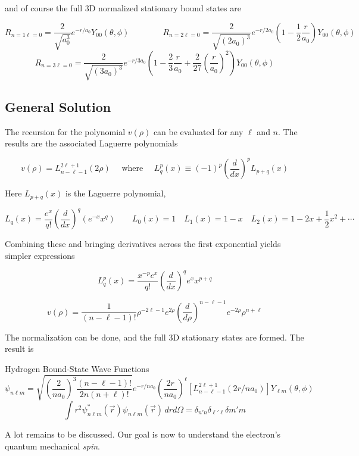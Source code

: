 and of course the full 3D normalized stationary bound states are 

\[ R_{n=1\ell =0} = \frac{2}{\sqrt{a_0^3}}e^{-r / a_0} Y_{00} (\theta, \phi) \qquad \qquad R_{n=2
  \ell =0} = \frac{2}{\sqrt{(2a_0)^3}}e^{-r / 2a_0} \left( 1 - \frac{1}{2}
\frac{r}{a_0} \right)Y_{00} (\theta, \phi) \] 
\[ R_{n=3 \ell = 0} = \frac{2}{\sqrt{(3a_0)^3}}e^{-r / 3a_0} \left(
  1 - \frac{2}{3} \frac{r}{a_0} + \frac{2}{27} \left( \frac{r}{a_0} \right)^2
\right)Y_{00} (\theta, \phi)  \] \vspace{3px}



\subsection{General Solution}

The recursion for the polynomial $v(\rho)$ can be evaluated for any $\ell $ and
$n$. The results are the associated Laguerre polynomials 

\[
  v(\rho) = L_{n - \ell -1}^{2\ell +1} (2\rho) \quad \text{ where } \quad
  L_q^p(x) \equiv (-1)^p \left( \frac{d }{d x}  \right) ^p L_{p+q}(x) 
\] \vspace{3px}

Here $L_{p+q}(x)$ is the Laguerre polynomial, 

\[
  L_q(x) = \frac{e^x}{q!} \left( \frac{d }{d x}  \right) ^q (e^{-x} x^q) \qquad
  L_0(x) = 1 \quad L_1(x) = 1-x \quad L_2(x) = 1 - 2x + \frac{1}{2}x^2 + \cdots
\] \vspace{3px}

Combining these and bringing derivatives across the first exponential yields
simpler expressions

\[
  L_q^p(x) = \frac{x^{-p} e^x}{q!} \left( \frac{d }{d x}  \right) ^q e^x
x^{p+q} \]  

\[ v(\rho) = \frac{1}{(n - \ell - 1)!} \rho^{-2\ell - 1} e^{2\rho} \left(
\frac{d }{d \rho}  \right) ^{n - \ell - 1} e^{-2\rho} \rho^{n + \ell } \]
\vspace{3px}

The normalization can be done, and the full 3D stationary states are formed.
The result is 

\begin{subbox}{Hydrogen Bound-State Wave Functions}
  \[ \psi_{n\ell m} = \sqrt{ \left( \frac{2}{na_0} \right) ^3 \frac{(n - \ell
    - 1)!}{2n(n+\ell)! } }e^{-r / na_0} \left( \frac{2r}{na_0} \right) ^\ell
    \left[ L_{n - \ell -1}^{2\ell +1} (2r / na_0) \right] Y_{\ell m}(\theta,
    \phi) \] \[ \int r^2 \psi^*_{n\ell m}(\vec{r}) \psi_{n \ell m}(\vec{r}) \,
  dr d\Omega = \delta_{n'n}\delta_{\ell ' \ell } \delta{m'm} \] \vspace{3px}
\end{subbox}


A lot remains to be discussed. Our goal is now to understand the electron's quantum mechanical
\textit{spin}. 






